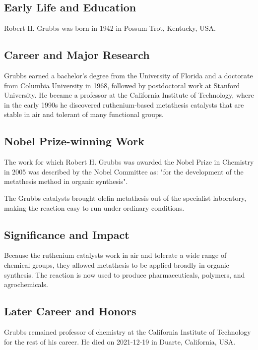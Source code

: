 \subsection*{Early Life and Education}

Robert H. Grubbs was born in 1942 in Possum Trot, Kentucky, USA.

\subsection*{Career and Major Research}

Grubbs earned a bachelor's degree from the University of Florida and a doctorate from Columbia University in 1968, followed by postdoctoral work at Stanford University. He became a professor at the California Institute of Technology, where in the early 1990s he discovered ruthenium-based metathesis catalysts that are stable in air and tolerant of many functional groups.

\subsection*{Nobel Prize-winning Work}

The work for which Robert H. Grubbs was awarded the Nobel Prize in Chemistry in 2005 was described by the Nobel Committee as: "for the development of the metathesis method in organic synthesis".

The Grubbs catalysts brought olefin metathesis out of the specialist laboratory, making the reaction easy to run under ordinary conditions.

\subsection*{Significance and Impact}

Because the ruthenium catalysts work in air and tolerate a wide range of chemical groups, they allowed metathesis to be applied broadly in organic synthesis. The reaction is now used to produce pharmaceuticals, polymers, and agrochemicals.

\subsection*{Later Career and Honors}

Grubbs remained professor of chemistry at the California Institute of Technology for the rest of his career. He died on 2021-12-19 in Duarte, California, USA.

